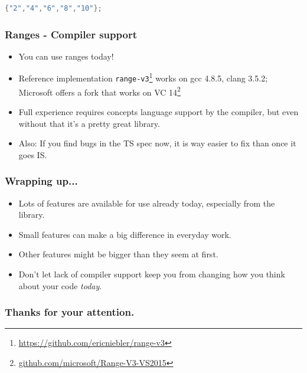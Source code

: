 \documentclass{beamer}
\begin{document}
\begin{frame}[fragile]
\begin{lstlisting}[language=C++,basicstyle=\ttfamily,keywordstyle=\color{blue},showstringspaces=false]
{"2","4","6","8","10"};
    \end{lstlisting}
\end{frame}

\begin{frame}
    \frametitle{Ranges - Compiler support}
    \begin{itemize}
        \item You can use ranges today!
        \item Reference implementation \texttt{range-v3}\footnote{\url{https://github.com/ericniebler/range-v3}} works on gcc 4.8.5, clang 3.5.2; Microsoft offers a fork that works on VC 14\footnote{\url{github.com/microsoft/Range-V3-VS2015}}
        \item Full experience requires concepts language support by the compiler, but even without that it's a pretty great library.
        \item Also: If you find bugs in the TS spec now, it is way easier to fix than once it goes IS.
    \end{itemize}
\end{frame}


\begin{frame}
    \frametitle{Wrapping up...}
    \begin{itemize}
        \item Lots of features are available for use already today, especially from the library.
        \item Small features can make a big difference in everyday work.
        \item Other features might be bigger than they seem at first.
        \item Don't let lack of compiler support keep you from changing how you think about your code \emph{today}.
    \end{itemize}
\end{frame}

\fi

\begin{frame}
  \frametitle{Thanks for your attention.}
\end{frame}
\end{document}
